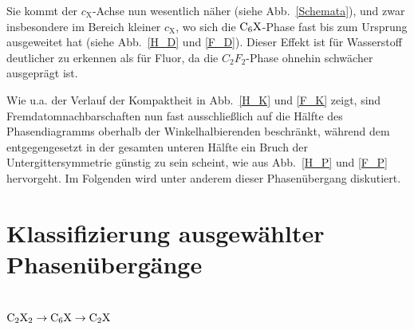 \documentclass[a4paper, 10pt, twoside, openany]{book} %
\def \cX {c_\mathrm{X}}
\begin{document}
	Sie kommt der $\cX$-Achse nun wesentlich näher (siehe Abb.~\ref{Schemata}), und zwar insbesondere im Bereich kleiner $\cX$, wo sich die $\rm C_6X$-Phase fast bis zum Ursprung ausgeweitet hat (siehe Abb.~\ref{H_D} und \ref{F_D}). Dieser Effekt ist für Wasserstoff deutlicher zu erkennen als für Fluor, da die $C_2F_2$-Phase ohnehin schwächer ausgeprägt ist.
	
	Wie u.a. der Verlauf der Kompaktheit in Abb.~\ref{H_K} und \ref{F_K} zeigt, sind Fremdatomnachbarschaften nun fast ausschließlich auf die Hälfte des Phasendiagramms oberhalb der Winkelhalbierenden beschränkt, während dem entgegengesetzt in der gesamten unteren Hälfte ein Bruch der Untergittersymmetrie günstig zu sein scheint, wie aus Abb.~\ref{H_P} und \ref{F_P} hervorgeht. Im Folgenden wird unter anderem dieser Phasenübergang diskutiert.
	
	\section{Klassifizierung ausgewählter Phasenübergänge}
	\label{Klassifizierung ausgewaehlter Phasenuebergaenge}
	
	\subsection{$\rm C_2X_2 \rightarrow C_6X \rightarrow C_2X$}
	
\end{document}
